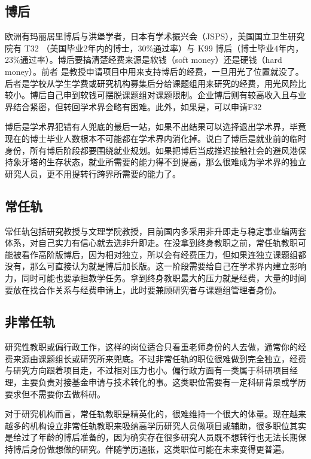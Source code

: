 \documentclass[]{tufte-book}
\begin{document}
\hypertarget{ux535aux540e}{%
\subsection{博后}\label{ux535aux540e}}

欧洲有玛丽居里博后与洪堡学者，日本有学术振兴会（JSPS），美国国立卫生研究院有 T32 （美国毕业2年内的博士，30\%通过率）与 K99 博后（博士毕业4年内，23\%通过率）。博后要搞清楚经费来源是软钱（soft money）还是硬钱（hard money）。前者 是教授申请项目中用来支持博后的经费，一旦用光了位置就没了。后者是学校从学生学费或研究机构募集后分给课题组用来研究的经费，用光风险比较小。博后自己申到软钱可摆脱课题组对课题限制。企业博后则有较高收入且与业界结合紧密，但转回学术界会略有困难。此外，如果是，可以申请F32

博后是学术界犯错有人兜底的最后一站，如果不出结果可以选择退出学术界，毕竟现在的博士毕业人数根本不可能都在学术界内消化掉。说白了博后是就业前的临时身份，所有博后阶段都要围绕就业规划。如果把博后当成推迟接触社会的避风港保持象牙塔的生存状态，就业所需要的能力得不到提高，那么很难成为学术界的独立研究人员，更不用提转行跨界所需要的能力了。

\hypertarget{ux5e38ux4efbux8f68}{%
\subsection{常任轨}\label{ux5e38ux4efbux8f68}}

常任轨包括研究教授与文理学院教授，目前国内多采用非升即走与稳定事业编两套体系，对自己实力有信心就去选非升即走。在没拿到终身教职之前，常任轨教职可能被看作高阶版博后，因为相对独立，所以会有经费压力，但如果连独立课题组都没有，那么可直接认为就是博后加长版。这一阶段需要给自己在学术界内建立影响力，同时可能也要承担教学任务。拿到终身教职最大的压力就是经费，大量的时间要放在找合作关系与经费申请上，此时要兼顾研究者与课题组管理者身份。

\hypertarget{ux975eux5e38ux4efbux8f68}{%
\subsection{非常任轨}\label{ux975eux5e38ux4efbux8f68}}

研究性教职或偏行政工作，这样的岗位适合只看重老师身份的人去做，通常你的经费来源由课题组长或研究所来兜底。不过非常任轨的职位很难做到完全独立，经费与研究方向跟着项目走，不过相对压力也小。偏行政方面有一类属于科研项目经理，主要负责对接基金申请与技术转化的事。这类职位需要有一定科研背景或学历要求但不需要你去做科研。

对于研究机构而言，常任轨教职是精英化的，很难维持一个很大的体量。现在越来越多的机构设立非常任轨教职来吸纳高学历研究人员做项目或辅助，很多职位其实是给过了年龄的博后准备的，因为确实存在很多研究人员既不想转行也无法长期保持博后身份做想做的研究。伴随学历通胀，这类职位可能在未来变得更普遍。
\end{document}
